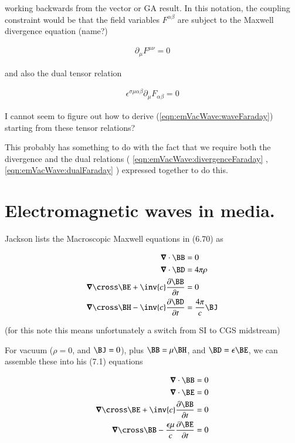 working backwards from the vector or GA result.  In this notation, the coupling constraint would be that the field variables
$F^{\alpha\beta}$ are subject to the Maxwell divergence equation (name?)

\begin{align}\label{eqn:emVacWave:divergenceFaraday}
\partial_\mu F^{\mu\nu} = 0
\end{align}

and also the dual tensor relation

\begin{align}\label{eqn:emVacWave:dualFaraday}
\epsilon^{\sigma\mu\alpha\beta} \partial_\mu F_{\alpha\beta} = 0
\end{align}

I cannot seem to figure out how to derive (\ref{eqn:emVacWave:waveFaraday}) starting from these tensor relations?

This probably has something to do with the fact that we require both the divergence and the dual relations 
(
\ref{eqn:emVacWave:divergenceFaraday}
,
\ref{eqn:emVacWave:dualFaraday}
)
expressed together to do this.

\section{Electromagnetic waves in media.}

Jackson lists the Macroscopic Maxwell equations in (6.70) as 

\begin{align*}
\spacegrad \cdot \BB &= 0 \\
\spacegrad \cdot \BD &= 4 \pi \rho \\
\spacegrad \cross \BE + \inv{c}\PD{t}{\BB} &= 0 \\
\spacegrad \cross \BH - \inv{c}\PD{t}{\BD} &= \frac{4 \pi}{c} \BJ  \\
\end{align*}

(for this note this means unfortunately a switch from SI to CGS midstream)

For vacuum ($\rho =0$, and $\BJ =0$), plus $\BB = \mu \BH$, and $\BD = \epsilon \BE$, we can assemble these into his (7.1) equations

\begin{align*}
\spacegrad \cdot \BB &= 0 \\
\spacegrad \cdot \BE &= 0 \\
\spacegrad \cross \BE + \inv{c}\PD{t}{\BB} &= 0 \\
\spacegrad \cross \BB - \frac{\epsilon \mu}{c}\PD{t}{\BE} &= 0  \\
\end{align*}

